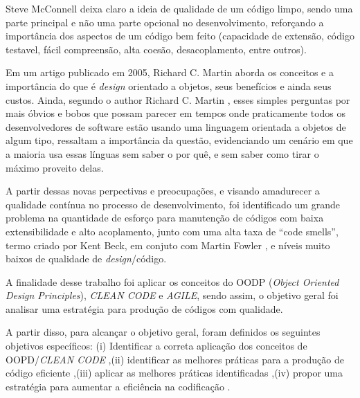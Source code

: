 \documentclass[12pt]{article}
\begin{document}
Steve McConnell \cite{CODE_COMPLETE_2} deixa claro a ideia de qualidade de um código limpo, sendo uma parte principal e não uma parte opcional no desenvolvimento, reforçando a importância dos aspectos de um código bem feito (capacidade de extensão, código testavel, fácil compreensão, alta coesão, desacoplamento, entre outros).

Em um artigo publicado em 2005, Richard C. Martin \cite{THE_PRINCIPLES_OF_OOD} aborda os conceitos e a importância do que é \textit{design} orientado a objetos, seus benefícios e ainda seus custos.
Ainda, segundo o author Richard C. Martin \cite{THE_PRINCIPLES_OF_OOD}, esses simples perguntas por mais óbvios e bobos que possam parecer em tempos onde praticamente todos os desenvolvedores de software estão usando uma linguagem orientada a objetos de algum tipo, ressaltam a importância da questão, evidenciando um cenário em que a maioria usa essas línguas sem saber o por quê, e sem saber como tirar o máximo proveito delas.


A partir dessas novas perpectivas e preocupações, e visando amadurecer a qualidade contínua no processo de desenvolvimento, foi identificado um grande problema na quantidade de esforço para manutenção de códigos com baixa extensibilidade e alto acoplamento, junto com uma alta taxa de “code smells”, termo criado por Kent Beck, em conjuto com Martin Fowler \cite{MARTIN_FOWLER_REFACTORING}, e níveis muito baixos de qualidade de \textit{design}/código.



A finalidade desse trabalho foi aplicar os conceitos do OODP (\textit{Object Oriented Design Principles}), \textit{CLEAN CODE} e \textit{AGILE}, sendo assim, o objetivo geral foi analisar uma estratégia para produção de códigos com qualidade.

A partir disso, para alcançar o objetivo geral, foram definidos os seguintes objetivos específicos:
(i) Identificar a correta aplicação dos conceitos de OOPD/\textit{CLEAN CODE}
,(ii) identificar as melhores práticas para a produção de código eficiente
,(iii) aplicar as melhores práticas identificadas
,(iv) propor uma estratégia para aumentar a eficiência na codificação
.
\end{document}
